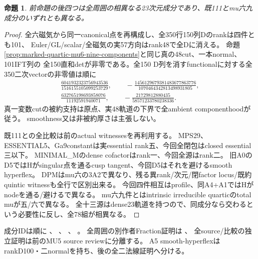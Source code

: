 \documentclass[a4paper,11pt]{ltjsarticle}
\newtheorem{proposition}{命題}[section]
\theoremstyle{definition}
\begin{document}
\begin{proposition}\label{prop:marked-quartic-mu5-four-components}
前命題の後四つは全周囲の相異なる23次元成分であり、既111とmu六九成分のいずれとも異なる。
\end{proposition}
\begin{proof}
全六磁気から同一canonical点を再構成し、全350行150列Dのrankは四件とも101、
Euler/GL/scalar/全磁気の実57方向はrank48で全Dに消える。
命題\ref{prop:marked-quartic-mu6-nine-components}と同じ真の48cut、一本normal、101IFT列の
全150直和detが非零である。全150 D列を消すfunctionalに対する全350二次vectorの非零値は順に
\[
\begin{gathered}
 \frac{6041932323756943536}{1516155105099253729},\qquad
 -\frac{1456129679381483677863776}{1070464342813498931805},\\
 \frac{632765198693858076}{11192591940071},\qquad
 -\frac{21729812880435}{58571233780238336}.
\end{gathered}
\]
真一変数cutの被約支持は原点、実48軌道の下界で全ambient componenthoodが従う。
smoothness又は非被約厚さは主張しない。

既111との全比較は前のactual witnessesを再利用する。
MPS29、ESSENTIAL5、Ga9constantは実essential rank五、今回全閉包はclosed essential三以下。
MINIMAL\_Mのdense cofactorはrank一、今回全源はrank二。
旧A0のD5ではHがsingular点を通るcusp tangent、今回D5はそれを避けるsmooth hyperflex。
DPMはmu六の3A2で異なり、残る異rank/次元/閉factor locus/既約quintic witnessも全行で区別出来る。
今回四件相互はprofile、同A4+A1ではHがnodeを通る/避けるで異なる。
mu六九件とはintrinsic irreducible quarticのtotal muが五/六で異なる。
全十三源はdense23軌道を持つので、同成分なら交わるという必要性に反し、全78組が相異なる。
\end{proof}
成分IDは順に
、
、
、
。
全周囲の別作者Fraction証明は
、
全source/比較の独立証明は前のMU5 source reviewに分離する。
A5 smooth-hyperflexはrankD100・二normalを持ち、後の全二法線証明へ分ける。
\end{document}
